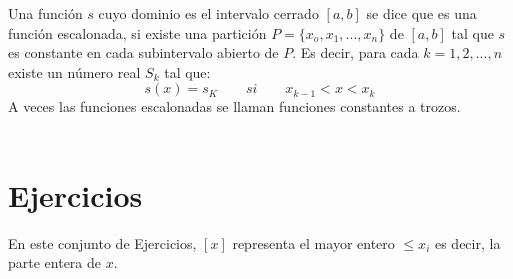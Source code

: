 
    \begin{tcolorbox}
	\begin{def.}
	    Una función $s$ cuyo dominio es el intervalo cerrado $\left[a,b\right]$ se dice que es una función escalonada, si existe una partición $P=\lbrace x_o,x_1,...,x_n \rbrace$ de $\left[ a,b \right]$ tal que $s$ es constante en cada subintervalo abierto de $P$. Es decir, para cada $k=1,2,...,n$ existe un número real $S_k$ tal que: $$s(x)=s_K \qquad si \qquad x_{k-1}<x<x_k$$ A veces las funciones escalonadas se llaman funciones constantes a trozos.\\\\
	\end{def.}
    \end{tcolorbox}

\setcounter{section}{10}
\section{Ejercicios}

    En este conjunto de Ejercicios, $\left[x\right]$ representa el mayor entero $\leq x_i$ es decir, la parte entera de $x$.\\

